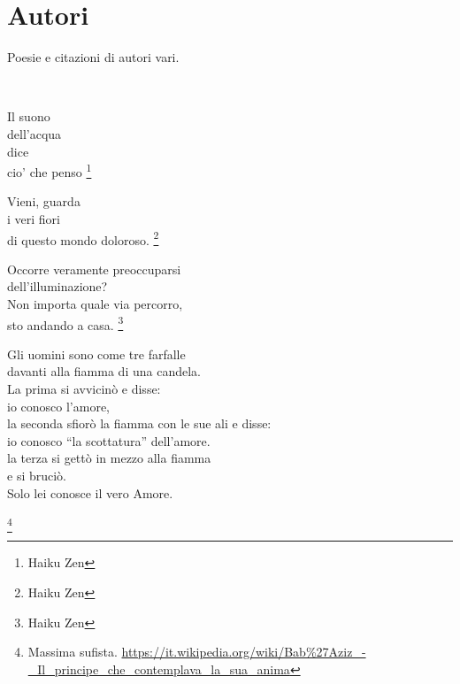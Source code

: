 \section{Autori}

Poesie e citazioni di autori vari.

\leavevmode\\[0.25in]

\vfill

\begin{haiku}
Il suono\\
dell'acqua\\
dice\\
cio' che penso \footnote{Haiku Zen}\\
\end{haiku}

\label{dolorosoMondo}
\begin{haiku}
Vieni, guarda\\
i veri fiori\\
di questo mondo doloroso.  \footnote{Haiku Zen}\\
\end{haiku}

\begin{haiku}
Occorre veramente preoccuparsi\\
dell'illuminazione?\\
Non importa quale via percorro,\\
sto andando a casa.  \footnote{Haiku Zen}\\
\end{haiku}

\begin{vcentered}
    \begin{poem}
Gli uomini sono come tre farfalle\\
davanti alla fiamma di una candela.\\
La prima si avvicinò e disse:\\
io conosco l'amore,\\
la seconda sfiorò la fiamma con le sue ali e disse:\\
io conosco ``la scottatura'' dell’amore.\\
la terza si gettò in mezzo alla fiamma\\
e si bruciò. \\
Solo lei conosce il vero Amore.\\
    \end{poem}
    \footnote{Massima sufista. \url{https://it.wikipedia.org/wiki/Bab\%27Aziz\_-\_Il\_principe\_che\_contemplava\_la\_sua\_anima}}
\end{vcentered}

